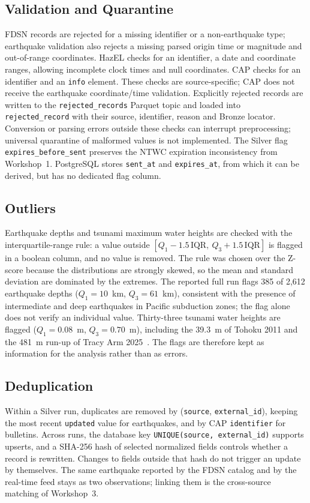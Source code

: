 \documentclass[a4paper,11pt,oneside]{book}
\begin{document}
\subsection{Validation and Quarantine}
FDSN records are rejected for a missing identifier or a non-earthquake type; earthquake validation also rejects a missing parsed origin time or magnitude and out-of-range coordinates. HazEL checks for an identifier, a date and coordinate ranges, allowing incomplete clock times and null coordinates. CAP checks for an identifier and an \texttt{info} element. These checks are source-specific; CAP does not receive the earthquake coordinate/time validation.
Explicitly rejected records are written to the \texttt{rejected\_records} Parquet topic and loaded into \texttt{rejected\_record} with their source, identifier, reason and Bronze locator. Conversion or parsing errors outside these checks can interrupt preprocessing; universal quarantine of malformed values is not implemented.
The Silver flag \texttt{expires\_before\_sent} preserves the NTWC expiration inconsistency from Workshop~1. PostgreSQL stores \texttt{sent\_at} and \texttt{expires\_at}, from which it can be derived, but has no dedicated flag column.
\subsection{Outliers}
Earthquake depths and tsunami maximum water heights are checked with the interquartile-range rule: a value outside $[Q_1 - 1.5\,\mathrm{IQR},\ Q_3 + 1.5\,\mathrm{IQR}]$ is flagged in a boolean column, and no value is removed.
The rule was chosen over the Z-score because the distributions are strongly skewed, so the mean and standard deviation are dominated by the extremes.
The reported full run flags 385 of 2,612 earthquake depths ($Q_1 = 10$~km, $Q_3 = 61$~km), consistent with the presence of intermediate and deep earthquakes in Pacific subduction zones; the flag alone does not verify an individual value.
Thirty-three tsunami water heights are flagged ($Q_1 = 0.08$~m, $Q_3 = 0.70$~m), including the 39.3~m of Tohoku 2011 and the 481~m run-up of Tracy Arm 2025~\cite{tracy}.
The flags are therefore kept as information for the analysis rather than as errors.
\subsection{Deduplication}
Within a Silver run, duplicates are removed by (\texttt{source}, \texttt{external\_id}), keeping the most recent \texttt{updated} value for earthquakes, and by CAP \texttt{identifier} for bulletins.
Across runs, the database key \texttt{UNIQUE(source, external\_id)} supports upserts, and a SHA-256 hash of selected normalized fields controls whether a record is rewritten. Changes to fields outside that hash do not trigger an update by themselves.
The same earthquake reported by the FDSN catalog and by the real-time feed stays as two observations; linking them is the cross-source matching of Workshop~3.
\end{document}

